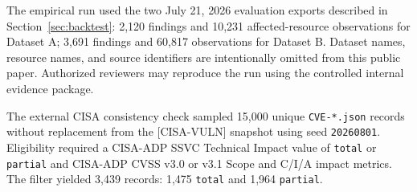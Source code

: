 \documentclass[11pt]{article}
\newcommand{\code}[1]{\texttt{#1}}
\begin{document}
The empirical run used the two July 21, 2026 evaluation exports described in
Section~\ref{sec:backtest}: 2,120 findings and 10,231 affected-resource observations
for Dataset A; 3,691 findings and 60,817 observations for Dataset B. Dataset names,
resource names, and source identifiers are intentionally omitted from this public
paper. Authorized reviewers may reproduce the run using the controlled internal
evidence package.

The external CISA consistency check sampled 15,000 unique \code{CVE-*.json}
records without replacement from the \mbox{[CISA-VULN]} snapshot using seed
\code{20260801}. Eligibility required a CISA-ADP SSVC Technical Impact value of
\code{total} or \code{partial} and CISA-ADP CVSS v3.0 or v3.1 Scope and C/I/A
impact metrics. The filter yielded 3,439 records: 1,475 \code{total} and 1,964
\code{partial}.
\end{document}
